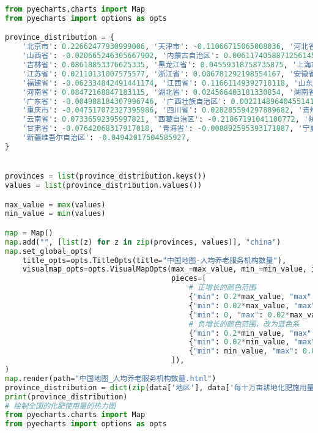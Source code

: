 \begin{lstlisting}[language=python,caption={基础设施}]
from pyecharts.charts import Map
from pyecharts import options as opts

province_distribution = {
    '北京市': 0.22662477930999006, '天津市': -0.11066715065008036, '河北省': -0.03297699943370547, 
    '山西省': -0.020665246305667902, '内蒙古自治区': 0.0061174058871256145, '辽宁省': 0.0, 
    '吉林省': 0.08618853376625335, '黑龙江省': 0.04559318758735875, '上海市': -0.02750752753392693, 
    '江苏省': 0.02110131007575577, '浙江省': 0.006781292198554167, '安徽省': 0.06593591105070629, 
    '福建省': -0.062334842491441174, '江西省': 0.11661149392718118, '山东省': 0.07456993182354199, 
    '河南省': 0.08472168847183115, '湖北省': 0.024566403181330854, '湖南省': 0.01610752112792979, 
    '广东省': -0.004988184307996746, '广西壮族自治区': 0.002214896404551414, '海南省': -0.17034110136755032, 
    '重庆市': -0.047517072327395986, '四川省': 0.028285594297889682, '贵州省': -0.07083907670928691, 
    '云南省': 0.07336592395997821, '西藏自治区': -0.21867191041100772, '陕西省': -0.07083907670928691, 
    '甘肃省': -0.07642068317917018, '青海省': -0.008892595393171887, '宁夏回族自治区': 0.0157684228081092, 
    '新疆维吾尔自治区': -0.04942017504585927,
}


provinces = list(province_distribution.keys())
values = list(province_distribution.values())

max_value = max(values)
min_value = min(values)

map = Map()
map.add("", [list(z) for z in zip(provinces, values)], "china")
map.set_global_opts(
    title_opts=opts.TitleOpts(title="中国地图-人均养老服务机构数量"),
    visualmap_opts=opts.VisualMapOpts(max_=max_value, min_=min_value, is_piecewise=True,
                                      pieces=[
                                          # 正增长的颜色范围
                                          {"min": 0.2*max_value, "max": max_value, "label": "高正增长", "color": "#8B0000"},
                                          {"min": 0.02*max_value, "max": 0.2*max_value, "label": "中正增长", "color": "#FF6347"},
                                          {"min": 0, "max": 0.02*max_value, "label": "低正增长", "color": "#FFA07A"},
                                          # 负增长的颜色范围，改为蓝色系
                                          {"min": 0.2*min_value, "max": 0, "label": "低负增长", "color": "#ADD8E6"},
                                          {"min": 0.02*min_value, "max": 0.2*min_value, "label": "中负增长", "color": "#4169E1"},
                                          {"min": min_value, "max": 0.02*min_value, "label": "高负增长", "color": "#00008B"},
                                      ]),
)
map.render(path="中国地图_人均养老服务机构数量.html")
province_distribution = dict(zip(data['地区'], data['每十万亩耕地化肥施用量']))
print(province_distribution)
# 绘制全国的化肥使用量的热力图
from pyecharts.charts import Map
from pyecharts import options as opts


\end{lstlisting}
